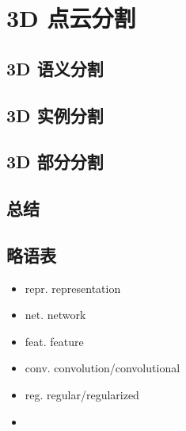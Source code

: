 \documentclass{article}
\begin{document}
\section{3D 点云分割}

\subsection{3D 语义分割}
\subsection{3D 实例分割}
\subsection{3D 部分分割}
\subsection{总结}

\subsection{略语表}
\begin{itemize}
    \item repr. \trarr representation
    \item net. \trarr network
    \item feat. \trarr feature
    \item conv. \trarr convolution/convolutional
    \item reg. \trarr regular/regularized
    \item 
\end{itemize}
\end{document}
